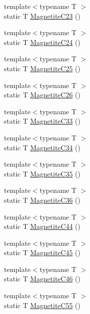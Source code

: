 \begin{DoxyCompactItemize}
{\footnotesize template$<$typename T $>$ }\\static T \mbox{\hyperlink{namespacempc_1_1data_abd1234216ade8e4dd5469f010ec31bdb}{Magnetite\+C23}} ()
\item 
{\footnotesize template$<$typename T $>$ }\\static T \mbox{\hyperlink{namespacempc_1_1data_ad2175c028279ed0e8995d2862e4e935b}{Magnetite\+C24}} ()
\item 
{\footnotesize template$<$typename T $>$ }\\static T \mbox{\hyperlink{namespacempc_1_1data_acb6d4b8d8e75c1f5615eea52b858d7ea}{Magnetite\+C25}} ()
\item 
{\footnotesize template$<$typename T $>$ }\\static T \mbox{\hyperlink{namespacempc_1_1data_a571e718bc6125526ae121f770ab7e05a}{Magnetite\+C26}} ()
\item 
{\footnotesize template$<$typename T $>$ }\\static T \mbox{\hyperlink{namespacempc_1_1data_ac20ca5aa06f9db3396f14871260f36f9}{Magnetite\+C33}} ()
\item 
{\footnotesize template$<$typename T $>$ }\\static T \mbox{\hyperlink{namespacempc_1_1data_aa9ada3fe75469548bcdb02dfec25292b}{Magnetite\+C34}} ()
\item 
{\footnotesize template$<$typename T $>$ }\\static T \mbox{\hyperlink{namespacempc_1_1data_afe23103e9af24514feba9b23f20736d1}{Magnetite\+C35}} ()
\item 
{\footnotesize template$<$typename T $>$ }\\static T \mbox{\hyperlink{namespacempc_1_1data_ab5da80a81289bc8688ca42aad786234d}{Magnetite\+C36}} ()
\item 
{\footnotesize template$<$typename T $>$ }\\static T \mbox{\hyperlink{namespacempc_1_1data_a28c00f4a5b7354d38e8f17bb30fd8389}{Magnetite\+C44}} ()
\item 
{\footnotesize template$<$typename T $>$ }\\static T \mbox{\hyperlink{namespacempc_1_1data_a6531a620dafbf43a3c2f185eb5e46aec}{Magnetite\+C45}} ()
\item 
{\footnotesize template$<$typename T $>$ }\\static T \mbox{\hyperlink{namespacempc_1_1data_af9814ae3c7605cf10580fb41f168684f}{Magnetite\+C46}} ()
\item 
{\footnotesize template$<$typename T $>$ }\\static T \mbox{\hyperlink{namespacempc_1_1data_a60038ef81dda8620398a8150802725e1}{Magnetite\+C55}} ()

\end{DoxyCompactItemize}

